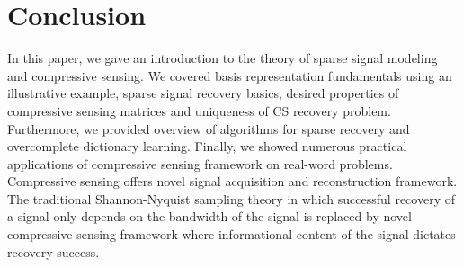 \documentclass[journal]{IEEEtran}
\begin{document}
%




\section{Conclusion} \label{sec:7}

In this paper, we gave an introduction to the theory of sparse signal modeling and compressive sensing. We covered basis representation fundamentals using an illustrative example, sparse signal recovery basics, desired properties of compressive sensing matrices and uniqueness of CS recovery problem. Furthermore, we provided overview of algorithms for sparse recovery and overcomplete dictionary learning. Finally, we showed numerous practical applications of compressive sensing framework on real-word problems. Compressive sensing offers novel signal acquisition and reconstruction framework. The traditional Shannon-Nyquist sampling theory in which successful recovery of a signal only depends on the bandwidth of the signal is replaced by novel compressive sensing framework where informational content of the signal dictates recovery success.
\end{document}

